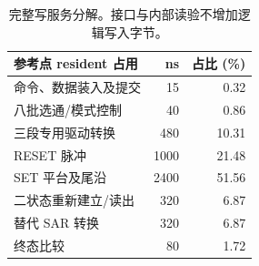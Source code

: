 \begin{table}[htbp]\centering\small
\begin{tabular}{@{}lrr@{}}\toprule
参考点 resident 占用 & ns & 占比 (\%)\\\midrule
命令、数据装入及提交 & 15 & 0.32\\
八批选通/模式控制 & 40 & 0.86\\
三段专用驱动转换 & 480 & 10.31\\
RESET 脉冲 & 1000 & 21.48\\
SET 平台及尾沿 & 2400 & 51.56\\
二状态重新建立/读出 & 320 & 6.87\\
替代 SAR 转换 & 320 & 6.87\\
终态比较 & 80 & 1.72\\
\bottomrule\end{tabular}
\caption{完整写服务分解。接口与内部读验不增加逻辑写入字节。}\label{07_pcm:tab:write}\end{table}

